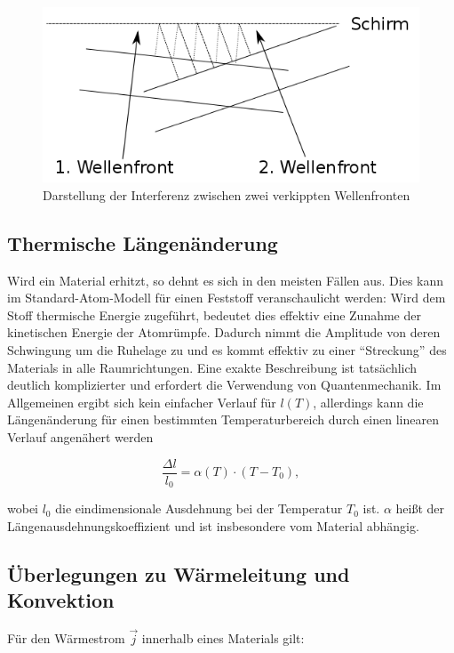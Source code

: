 \begin{figure}
\centering
        \includegraphics[width=.9\textwidth]{images/verkippung.png}
\caption{Darstellung der Interferenz zwischen zwei verkippten Wellenfronten}
\label{verkippung}
\end{figure}


\subsection{Thermische Längenänderung}
Wird ein Material erhitzt, so dehnt es sich in den meisten Fällen aus. Dies kann im Standard-Atom-Modell für einen Feststoff veranschaulicht werden: Wird dem Stoff thermische Energie zugeführt, bedeutet dies effektiv eine Zunahme der kinetischen Energie der Atomrümpfe. Dadurch nimmt die Amplitude von deren Schwingung um die Ruhelage zu und es kommt effektiv zu einer \enquote{Streckung} des Materials in alle Raumrichtungen. Eine exakte Beschreibung ist tatsächlich deutlich komplizierter und erfordert die Verwendung von Quantenmechanik. Im Allgemeinen ergibt sich kein einfacher Verlauf für $ l(T) $, allerdings kann die Längenänderung für einen bestimmten Temperaturbereich durch einen linearen Verlauf angenähert werden 

\begin{equation}
\frac{ \Delta l}{l_{0}} = \alpha(T) \cdot (T-T_{0}), 
\label{formel:ausdehnung}
\end{equation}

wobei $ l_{0} $ die eindimensionale Ausdehnung bei der Temperatur $ T_{0} $ ist. $ \alpha $ heißt der Längenausdehnungskoeffizient und ist insbesondere vom Material abhängig. 

\subsection{Überlegungen zu Wärmeleitung und Konvektion}
Für den Wärmestrom $ \vec{j} $ innerhalb eines Materials gilt: 

